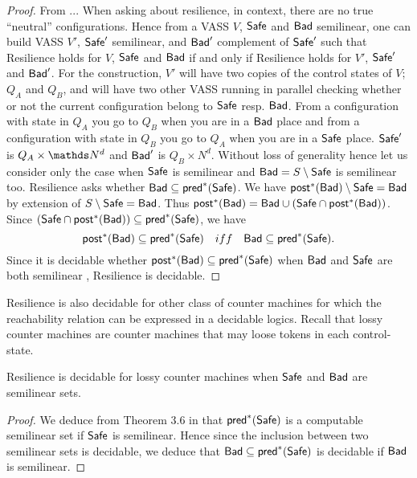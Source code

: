 \begin{proof}
 From \cite{DBLP:journals/corr/abs-2207-02697}...
When asking about resilience, in context, there are no true ``neutral'' configurations.
Hence from a VASS $V$, $\textsf{Safe}$ and $\textsf{Bad}$ semilinear, one can build VASS $V'$, $\textsf{Safe}'$ semilinear, and $\textsf{Bad}'$ complement of $\textsf{Safe}'$ such that {\sc Resilience} holds for
$V$, $\textsf{Safe}$ and $\textsf{Bad}$ if and only if {\sc Resilience} holds for
$V'$, $\textsf{Safe}'$ and $\textsf{Bad}'$. For the construction, $V'$ will have two copies of the control states of $V$; $Q_{A}$ and $Q_{B}$, and will have two other VASS running in parallel checking whether or not the current configuration belong to $\textsf{Safe}$ resp. $\textsf{Bad}$. 
From a configuration with state in $Q_{A}$ you go to $Q_B$ when you are in a $\textsf{Bad}$ place
and from a configuration with state in $Q_{B}$ you go to $Q_{A}$ when you are in a $\textsf{Safe}$ place.
$\textsf{Safe}'$ is $Q_A \times \N^d$ and $\textsf{Bad}'$ is $Q_B \times N^d$.
Without loss of generality hence let us consider only the case when $\textsf{Safe}$ is semilinear
and $\textsf{Bad} = S \setminus \textsf{Safe}$ is semilinear too.
{\sc Resilience} asks whether $\textsf{Bad} \subseteq \textsf{pred}^*(\textsf{Safe})$.
We have $\textsf{post}^*(\textsf{Bad}) \setminus \textsf{Safe} = \textsf{Bad}$ by extension of $S \setminus \textsf{Safe} = \textsf{Bad}$.
Thus $\textsf{post}^*(\textsf{Bad}) = \textsf{Bad} \cup (\textsf{Safe} \cap \textsf{post}^*(\textsf{Bad}))$. Since $(\textsf{Safe} \cap \textsf{post}^*(\textsf{Bad})) \subseteq \textsf{pred}^*(\textsf{Safe})$, we have
$$\textsf{post}^*(\textsf{Bad}) \subseteq \textsf{pred}^*(\textsf{Safe}) \quad iff \quad \textsf{Bad} \subseteq \textsf{pred}^*(\textsf{Safe}).$$
Since it is decidable whether $\textsf{post}^*(\textsf{Bad}) \subseteq \textsf{pred}^*(\textsf{Safe})$ when 
$\textsf{Bad}$ and $\textsf{Safe}$ are both semilinear \cite{DBLP:journals/corr/abs-2207-02697}, 
{\sc Resilience} is decidable.
\end{proof}

Resilience is also decidable for other class of counter machines for which the reachability relation can be expressed in a decidable logics. Recall that lossy counter machines \cite{DBLP:conf/rp/Schnoebelen10} are counter machines that may loose tokens in each control-state.

\begin{theorem}{}
Resilience is decidable for lossy counter machines when $\textsf{Safe}$ and $\textsf{Bad}$ are semilinear sets.
\end{theorem}

\begin{proof}
We deduce from Theorem 3.6 in \cite{DBLP:conf/rp/Schnoebelen10} that $\textsf{pred}^*(\textsf{Safe})$ is a computable semilinear set if $\textsf{Safe}$ is semilinear. Hence since the inclusion between two semilinear sets is decidable, we deduce that $\textsf{Bad} \subseteq \textsf{pred}^*(\textsf{Safe})$ is decidable if $\textsf{Bad}$ is semilinear.
\end{proof}

